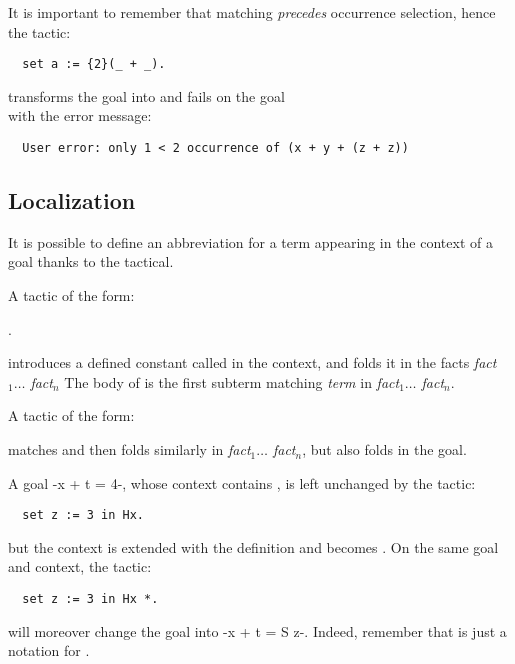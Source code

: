 It is important to remember that matching \emph{precedes} occurrence
selection, hence the tactic:
\begin{lstlisting}
  set a := {2}(_ + _).
\end{lstlisting}
transforms the goal  into 
and fails on the goal \\
 with the error message:
\begin{lstlisting}
  User error: only 1 < 2 occurrence of (x + y + (z + z))
\end{lstlisting}


\subsection{Localization}\label{ssec:loc}


It is possible to define an abbreviation for a term appearing in the
context of a goal thanks to the  tactical.

A tactic of the form:

\begin{center}
   {\term}  .
\end{center}

introduces a defined constant called  in the context, and folds
it in the facts \textit{fact$_1 \dots$ fact$_n$}
The body of  is the first subterm matching \textit{term} in
\textit{fact$_1 \dots$ fact$_n$}.

A tactic of the form:

\begin{center}
   {\term}   
\end{center}

matches {\term} and then folds  similarly in
\textit{fact$_1 \dots$ fact$_n$}, but also folds  in the goal.

A goal \ssrL-x + t = 4-, whose context contains , is left
unchanged by the tactic:
\begin{lstlisting}
  set z := 3 in Hx.
\end{lstlisting}
but the context is extended with the definition  and  becomes
.
On the same goal and context, the tactic:
\begin{lstlisting}
  set z := 3 in Hx *.
\end{lstlisting}
will moreover change the goal into \ssrL-x + t = S z-. Indeed, remember
that  is just a notation for .

